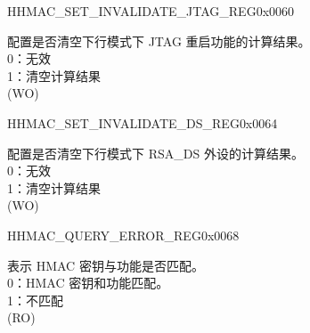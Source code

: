 \begin{register}{H}{HMAC\_SET\_INVALIDATE\_JTAG\_REG}{0x0060}\label{regdesc:HMACSETINVALIDATEJTAGREG}
%
%
\regnewline%
\begin{regdesc}\begin{reglist}
\label{fielddesc:HMACSETINVALIDATEJTAG}\item [HMAC\_SET\_INVALIDATE\_JTAG] 配置是否清空下行模式下 JTAG 重启功能的计算结果。
\\0：无效
\\1：清空计算结果
\\(WO)
\end{reglist}\end{regdesc}
\end{register}


\begin{register}{H}{HMAC\_SET\_INVALIDATE\_DS\_REG}{0x0064}\label{regdesc:HMACSETINVALIDATEDSREG}
%
%
\regnewline%
\begin{regdesc}\begin{reglist}
\label{fielddesc:HMACSETINVALIDATEDS}\item [HMAC\_SET\_INVALIDATE\_DS] 配置是否清空下行模式下 RSA\_DS 外设的计算结果。
\\0：无效
\\1：清空计算结果
\\(WO)
\end{reglist}\end{regdesc}
\end{register}


\begin{register}{H}{HMAC\_QUERY\_ERROR\_REG}{0x0068}\label{regdesc:HMACQUERYERRORREG}
%
%
\regnewline%
\begin{regdesc}\begin{reglist}
\label{fielddesc:HMACQUREYCHECK}\item [HMAC\_QUREY\_CHECK] 表示 HMAC 密钥与功能是否匹配。
\\0：HMAC 密钥和功能匹配。
\\1：不匹配
\\(RO)
\end{reglist}\end{regdesc}
\end{register}


